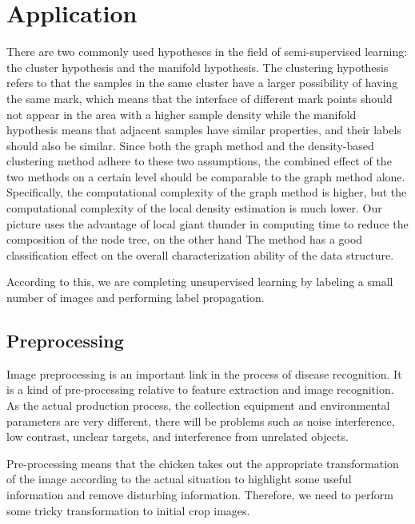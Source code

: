 \documentclass[11pt,en]{elegantpaper}
\begin{document}
\section{Application}

There are two commonly used hypotheses in the field of semi-supervised learning: the cluster hypothesis and the manifold hypothesis. The clustering hypothesis refers to that the samples in the same cluster have a larger possibility of having the same mark, which means that the interface of different mark points should not appear in the area with a higher sample density while the manifold hypothesis means that adjacent samples have similar properties, and their labels should also be similar\cite{shen2003multilabel}. Since both the graph method and the density-based clustering method adhere to these two assumptions, the combined effect of the two methods on a certain level should be comparable to the graph method alone. Specifically, the computational complexity of the graph method is higher, but the computational complexity of the local density estimation is much lower. Our picture uses the advantage of local giant thunder in computing time to reduce the composition of the node tree, on the other hand The method has a good classification effect on the overall characterization ability of the data structure.



According to this, we are completing unsupervised learning by labeling a small number of images and performing label propagation.

\subsection{Preprocessing}
Image preprocessing is an important link in the process of disease recognition. It is a kind of pre-processing relative to feature extraction and image recognition. As the actual production process, the collection equipment and environmental parameters are very different, there will be problems such as noise interference, low contrast, unclear targets, and interference from unrelated objects\cite{rechcigl2018environmentally}. 

Pre-processing means that the chicken takes out the appropriate transformation of the image according to the actual situation to highlight some useful information and remove disturbing information. Therefore, we need to perform some tricky transformation to initial crop images.
\end{document}
